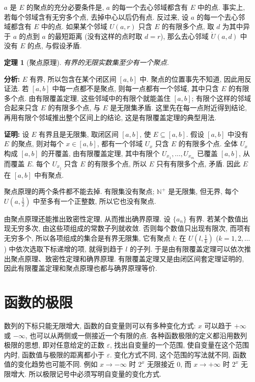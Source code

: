 \documentclass[UTF8,openany]{ctexbook}
\theoremstyle{chinesetextbook}
\newtheorem{theorem}{定理}[section]
\newenvironment{cnproof}{\par\indent\textbf{证明:} \ignorespaces}{\par}
\begin{document}
$a$ 是 $E$ 的聚点的充分必要条件是, $a$ 的每一个去心邻域都含有 $E$ 中的点. 事实上, 若每个邻域含有无穷多个点, 去掉中心以后仍有点. 反过来, 设 $a$ 的每一个去心邻域都含有 $E$ 中的点. 如果某个邻域 $U(a,r)$ 只含 $E$ 的有限多个点, 取 $d$ 为其中异于 $a$ 的点到 $a$ 的最短距离 (没有这样的点时取 $d=r$), 那么去心邻域 $\mathring U(a,d)$ 中没有 $E$ 的点, 与假设矛盾.
\begin{theorem}[聚点原理]
有界的无限实数集至少有一个聚点.
\end{theorem}
\par\indent\textbf{分析:} $E$ 有界, 所以包含在某个闭区间 $[a,b]$ 中. 聚点的位置事先不知道, 因此用反证法. 若 $[a,b]$ 中每一点都不是聚点, 则每一点都有一个邻域, 其中只含 $E$ 的有限多个点. 由有限覆盖定理, 这些邻域中的有限个就能盖住 $[a,b]$; 有限个这样的邻域合起来只含 $E$ 的有限多个点, 与 $E$ 是无限集矛盾. 这里先在每一点附近得到结论, 再用有限个邻域推出整个区间上的结论, 这是有限覆盖定理的典型用法.
\begin{cnproof}
设 $E$ 有界且是无限集, 取闭区间 $[a,b]$, 使 $E\subseteq[a,b]$. 假设 $[a,b]$ 中没有 $E$ 的聚点, 则对每个 $x\in[a,b]$, 都有一个邻域 $U_x$ 只含 $E$ 的有限多个点. 全体 $U_x$ 构成 $[a,b]$ 的开覆盖, 由有限覆盖定理, 其中有限个 $U_{x_1},\ldots,U_{x_m}$ 已覆盖 $[a,b]$, 从而覆盖 $E$. 每个 $U_{x_j}$ 只含 $E$ 的有限多个点, 所以 $E$ 只有有限多个点, 矛盾. 因此 $E$ 在 $[a,b]$ 中有聚点.
\end{cnproof}
聚点原理的两个条件都不能去掉. 有限集没有聚点; $\mathbb N^+$ 是无限集, 但无界, 每个 $\displaystyle U\left(a,\frac12\right)$ 中至多有一个正整数, 所以它也没有聚点.

由聚点原理还能推出致密性定理, 从而推出确界原理. 设 $\{a_n\}$ 有界. 若某个数值出现无穷多次, 由这些项组成的常数子列就收敛. 否则每个数值只出现有限次, 而项有无穷多个, 所以各项组成的集合是有界无限集, 它有聚点 $l$; 在 $\displaystyle U\left(l,\frac1k\right)$ ($k=1,2,\ldots$) 中依次选取下标递增的项, 就得到趋于 $l$ 的子列. 于是由有限覆盖定理可以依次推出聚点原理、致密性定理和确界原理. 有限覆盖定理又是由闭区间套定理证明的, 因此有限覆盖定理和聚点原理也都与确界原理等价.
\section{函数的极限}
数列的下标只能无限增大, 函数的自变量则可以有多种变化方式: $x$ 可以趋于 $+\infty$ 或 $-\infty$, 也可以从两侧或一侧接近一个有限的点. 各种函数极限的定义都沿用数列极限的思想, 即对任意给定的正数 $\varepsilon$, 找出自变量的一个范围, 使自变量在这个范围内时, 函数值与极限的距离都小于 $\varepsilon$. 变化方式不同, 这个范围的写法就不同, 函数值的变化趋势也可能不同. 例如 $x\to-\infty$ 时 $2^x$ 无限接近 $0$, 而 $x\to+\infty$ 时 $2^x$ 无限增大. 所以极限记号中必须写明自变量的变化方式.
\end{document}
